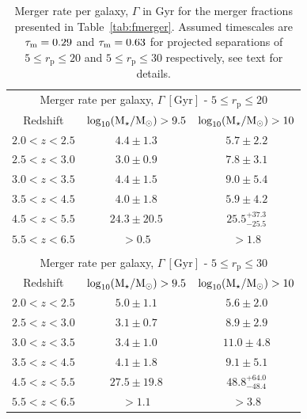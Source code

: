 \begin{table}
  \caption[Merger rate per galaxy, $\Gamma$ in Gyr for the merger fractions presented in Table~\ref{tab:fmerger}.]{Merger rate per galaxy, $\Gamma$ in Gyr for the merger fractions presented in Table~\ref{tab:fmerger}. Assumed timescales are $\tau_{\rm{m}} = 0.29$ and $\tau_{\rm{m}} = 0.63$ for projected separations of $5 \leq r_{\text{p}} \leq 20$ and $5 \leq r_{\text{p}} \leq 30$ respectively, see text for details.}
\centering
  \begin{tabular}{c|cc}
   \multicolumn{3}{c}{Merger rate per galaxy, $\Gamma~[\text{Gyr}]$ - $5 \leq r_{\text{p}} \leq 20$} \\ \noalign{\smallskip}
   Redshift  & $\log_{10}(\text{M}_{\star} / \text{M}_{\odot}) > 9.5$ & $\log_{10}(\text{M}_{\star} / \text{M}_{\odot}) > 10$ \\
    \hline
   $2.0 < z < 2.5$ & $4.4 \pm 1.3$ & $5.7 \pm 2.2$ \\
   $2.5 < z < 3.0$ & $ 3.0 \pm 0.9$ & $7.8 \pm 3.1$\\
   $3.0 < z < 3.5$ & $ 4.4 \pm 1.5$& $ 9.0 \pm 5.4$\\
   $3.5 < z < 4.5$ & $ 4.0 \pm 1.8$& $ 5.9 \pm 4.2$\\
   $4.5 < z < 5.5$ & $ 24.3 \pm 20.5$ & $ 25.5^{+37.3}_{-25.5}$\\
   $5.5 < z < 6.5$ & $ > 0.5$& $> 1.8$ \\  
    & & \\
    
   \multicolumn{3}{c}{Merger rate per galaxy, $\Gamma~[\text{Gyr}]$ - $5 \leq r_{\text{p}} \leq 30$} \\ \noalign{\smallskip}
   Redshift & $\log_{10}(\text{M}_{\star} / \text{M}_{\odot}) > 9.5$ & $\log_{10}(\text{M}_{\star} / \text{M}_{\odot}) > 10$ \\
    \hline
   $2.0 < z < 2.5$ & $5.0 \pm 1.1$ & $5.6 \pm 2.0$ \\
   $2.5 < z < 3.0$ & $3.1 \pm 0.7$& $8.9 \pm 2.9$\\
   $3.0 < z < 3.5$ & $3.4 \pm 1.0$& $11.0 \pm 4.8$ \\
   $3.5 < z < 4.5$ & $4.1 \pm 1.8$& $9.1 \pm 5.1$\\
   $4.5 < z < 5.5$ & $27.5 \pm 19.8$& $ 48.8^{+64.0}_{-48.4}$\\
   $5.5 < z < 6.5$ & $ > 1.1$ & $>3.8$ \\  
    
  \end{tabular}\label{tab:mergerpergal}
\end{table}


